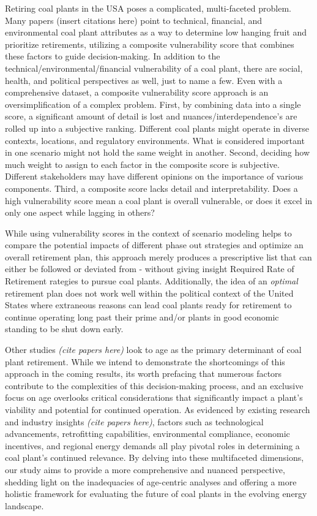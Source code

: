 Retiring coal plants in the USA poses a complicated, multi-faceted problem. Many papers (insert citations here) point to technical, financial, and environmental 
coal plant attributes as a way to determine low hanging fruit and prioritize retirements, utilizing a composite vulnerability score that combines these factors to guide 
decision-making. In addition to the technical/environmental/financial vulnerability of a coal plant, there are social, health, and political perspectives as well, just 
to name a few. Even with a comprehensive dataset, a composite vulnerability score approach is an oversimplification of a complex problem. 
First, by combining data into a single score, a significant amount of detail is lost and nuances/interdependence's are rolled up into a subjective 
ranking. Different coal plants might operate in diverse contexts, locations, and regulatory environments. What is considered important in 
one scenario might not hold the same weight in another. Second, deciding how much weight to assign to each factor in the composite score is subjective. Different stakeholders may have 
different opinions on the importance of various components. Third, a composite score lacks detail and interpretability. Does a high vulnerability score mean a coal plant is 
overall vulnerable, or does it excel in only one aspect while lagging in others?

While using vulnerability scores in the context of scenario modeling helps to compare the potential impacts of different phase out strategies and 
optimize an overall retirement plan, this approach merely produces a prescriptive list that can either be followed or deviated from - without giving 
insight Required Rate of Retirement rategies to pursue coal plants. Additionally, the idea of an \textit{optimal} retirement plan does not work well 
within the political context of the United States where extraneous reasons can lead coal plants ready for retirement to continue operating long 
past their prime and/or plants in good economic standing to be shut down early.

Other studies \textit{(cite papers here)} look to age as the primary determinant of coal plant retirement. While we intend to demonstrate the shortcomings of this approach 
in the coming results, its worth prefacing that numerous factors contribute to the complexities of this decision-making process, and an exclusive focus on age overlooks 
critical considerations that significantly impact a plant's viability and potential for continued operation. As evidenced by existing research and industry insights \textit{(cite papers here)}, 
factors such as technological advancements, retrofitting capabilities, environmental compliance, economic incentives, and regional energy demands all play pivotal roles 
in determining a coal plant's continued relevance. By delving into these multifaceted dimensions, our study aims to provide a more comprehensive and nuanced perspective, 
shedding light on the inadequacies of age-centric analyses and offering a more holistic framework for evaluating the future of coal plants in the evolving energy landscape.




